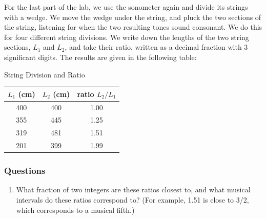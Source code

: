 \documentclass[11pt]{NSF}
\def\ben{\begin{enumerate}}
\def\een{\end{enumerate}}
\def\i{\item{}}
\begin{document}
For the last part of the lab, we use the sonometer again and 
divide its strings with a wedge.
We move the wedge under the string, and pluck the two sections 
of the string, listening for when the two resulting tones sound consonant.
We do this for four different string divisions.
We write down the lengths of the two string sections, $L_1$ and 
$L_2$, and take their ratio, written as a decimal fraction with 
3 significant digits.
The results are given in the following table:
%
\begin{table}[h!btp]
\begin{center}
String Division and Ratio\\
\begin{tabular}{| c | c | c | }
\hline
$L_1$ (cm) & $L_2$ (cm) & ratio $L_2/L_1$ \\
\hline
400 & 400 & 1.00 \\
\hline
355 & 445 & 1.25 \\
\hline
319 & 481 & 1.51 \\
\hline
201 & 399 & 1.99 \\ 
\hline
\end{tabular}
\label{t:4}
\end{center}
\end{table}
%

\subsubsection*{Questions}
%
\ben
\i What fraction of two integers are these ratios closest to,
and what musical intervals do these ratios correspond to?
(For example, 1.51 is close to 3/2, which corresponds to a musical 
fifth.)

\een
\end{document}
